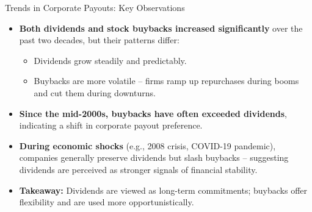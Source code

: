 \begin{frame}{Trends in Corporate Payouts: Key Observations}
\footnotesize
\begin{itemize}
    \item \textbf{Both dividends and stock buybacks increased significantly} over the past two decades, but their patterns differ:
    \begin{itemize}
        \item Dividends grow steadily and predictably.
        \item Buybacks are more volatile -- firms ramp up repurchases during booms and cut them during downturns.
    \end{itemize}
    
    \vspace{2mm}
    \item \textbf{Since the mid-2000s, buybacks have often exceeded dividends}, indicating a shift in corporate payout preference.
    
    \vspace{2mm}
    \item \textbf{During economic shocks} (e.g., 2008 crisis, COVID-19 pandemic), companies generally preserve dividends but slash buybacks -- suggesting dividends are perceived as stronger signals of financial stability.
    
    \vspace{2mm}
    \item \textbf{Takeaway:} Dividends are viewed as long-term commitments; buybacks offer flexibility and are used more opportunistically.
\end{itemize}
\end{frame}

